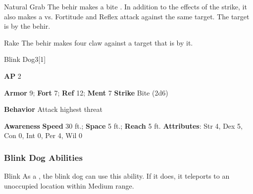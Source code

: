 \vspace{0.5em}
\begin{freeability}{Natural Grab}
The behir makes a bite .
In addition to the effects of the strike, it also makes a  vs. Fortitude and Reflex attack against the same target.
\hit The target is  by the behir.
\end{freeability}

\vspace{0.5em}
\begin{apability}{Rake}
The behir makes four claw  against a target that is  by it.
\end{apability}

\begin{monsection}{Blink Dog}{3}[1]
\vspace{-1em}\vspace{-1em}
\begin{spellcontent}
\begin{spelltargetinginfo}
{\textbf{AP} 2}

\pari \textbf{Armor} 9;
\textbf{Fort} 7;
\textbf{Ref} 12;
\textbf{Ment} 7
\pari \textbf{Strike} Bite  (2d6)



\pari \textbf{Behavior} Attack highest threat
\end{spelltargetinginfo}
\end{spellcontent}

\begin{monsterfooter}
\pari \textbf{Awareness} 
\pari \textbf{Speed} 30 ft.;
\textbf{Space} 5 ft.;
\textbf{Reach} 5 ft.
\pari \textbf{Attributes}:
Str 4,
Dex 5,
Con 0,
Int 0,
Per 4,
Wil 0
\end{monsterfooter}
\end{monsection}


\subsubsection{Blink Dog Abilities}

\begin{freeability}{Blink}
As a , the blink dog can use this ability.
If it does, it teleports to an unoccupied location within Medium range.
\end{freeability}

